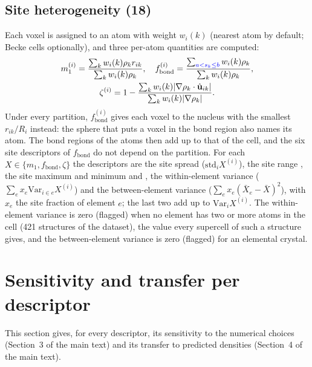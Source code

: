 \documentclass[journal=jctcce,manuscript=suppinfo,email=true]{achemso}
\newcommand{\rev}[1]{{\color{blue}#1}}
\begin{document}
\subsection{Site heterogeneity (18)}
Each voxel is assigned to an atom with weight $w_i(k)$ (nearest atom by default;
\rev{Becke cells} optionally), and three per-atom quantities are
computed:
\begin{equation}
\begin{gathered}
m_1^{(i)}=\frac{\sum_k w_i(k)\rho_k r_{ik}}{\sum_k w_i(k)\rho_k},\quad
f_\mathrm{bond}^{(i)}=\frac{\sum_{\rev{a<s_k\le b}}w_i(k)\rho_k}{\sum_k w_i(k)\rho_k},\\
\zeta^{(i)}=1-\frac{\sum_k w_i(k)|\nabla\rho_k\cdot\hat{\mathbf u}_{ik}|}{\sum_k w_i(k)|\nabla\rho_k|}.
\end{gathered}
\end{equation}
\rev{Under every partition, $f_\mathrm{bond}^{(i)}$ gives each voxel to the
nucleus with the smallest $r_{ik}/R_i$ instead: the sphere that puts a voxel in
the bond region also names its atom. The bond regions of the atoms then add up
to that of the cell, and the six site descriptors of $f_\mathrm{bond}$ do not
depend on the partition.} For each $X\in\{m_1,f_\mathrm{bond},\zeta\}$ the descriptors are
the site spread  ($\mathrm{std}_iX^{(i)}$), the site range
, the site maximum and minimum  and
, the within-element variance 
($\sum_e x_e\mathrm{Var}_{i\in e}X^{(i)}$) and the between-element variance
 ($\sum_e x_e(\bar X_e-\bar X)^2$), with $x_e$ the site fraction of element $e$;
the last two add up to $\mathrm{Var}_iX^{(i)}$. The within-element variance is \rev{zero}
(flagged) when no element has two or more atoms in the cell\rev{ (421 structures of
the dataset), the value every supercell of such a structure gives}, and the between-element
variance is zero (flagged) for an elemental crystal.

\section{Sensitivity and transfer per descriptor}
\label{si:stability}

This section gives, for every descriptor, its sensitivity to the numerical
choices (Section~3 of the main text) and its transfer to predicted densities
(Section~4 of the main text).
\end{document}
